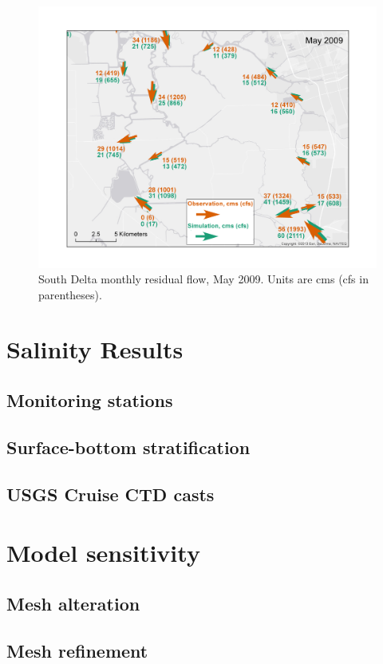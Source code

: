 \begin{figure}
	\centering
		\includegraphics[width=\textwidth]{image/residual_flow_south_delta_64a_may}
	\caption{South Delta monthly residual flow, May 2009. Units are cms (cfs in parentheses).}
	\label{fig:resid_south_may}
\end{figure}
	
\section{Salinity Results}
  \subsection{Monitoring stations}
  \subsection{Surface-bottom stratification}
	\subsection{USGS Cruise CTD casts}

\section{Model sensitivity}
  \subsection{Mesh alteration}
	\subsection{Mesh refinement}

